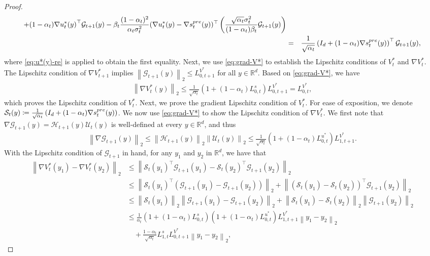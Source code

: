 \documentclass[10pt,a4paper]{amsart}
\newcommand{\R}{\mathbb{R}}
\newcommand{\parenthesis}[1]{\left( #1 \right)}
\newcommand{\mcal}[1]{\mathcal{#1}}
\newcommand{\norm}[1]{\left \|#1\right \|}
\begin{document}
\begin{proof}
\begin{eqnarray}
{ + (1 - \alpha_t) \nabla u_t^*(y)}^\top\mathcal{G}_{t+1}(y)- \beta_t \frac{(1 - \alpha_{t})^{2}}{\alpha_{t}\sigma_{t}^{2}}(\nabla u_t^*(y) - \nabla s^{\rm pre}_{t}(y))^\top\left(  \frac{\sqrt{\alpha_{t}}\sigma_{t}^{2}}{(1 - \alpha_{t})\beta_t}\mathcal{G}_{t+1}(y)\right)\nonumber\\
 &=&\frac{1}{\sqrt{\alpha_t}}\parenthesis{I_d 
 + (1 - \alpha_t) \nabla s_t^{\rm pre}(y)}^\top\mathcal{G}_{t+1}(y) \label{eq:grad-V*},
\end{eqnarray}
where \eqref{eq:u*(y)-re} is applied to obtain the first equality. Next, we use \eqref{eq:grad-V*} to establish the Lipschitz conditions of $ V_{t}^{*} $ and $\nabla V_t^{*}$. The Lipschitz condition of $\nabla V_{t+1}^*$ implies $\norm{\mcal{G}_{t+1}(y)}_2 \leq L_{0, t+1}^{V^*}$ for all $y \in \R^d$. Based on \eqref{eq:grad-V*}, we have
\begin{align*}
\norm{\nabla V_{t}^{*}(y)}_{2} \leq \frac{1}{\sqrt{\alpha_t}}(1 + (1 - \alpha_t)L_{0, t}^{s})
L_{0, t+1}^{V^*} = L_{0, t}^{V^*},
\end{align*}
which proves the Lipschitz condition of $ V_t^* $. Next, we prove the gradient Lipschitz condition of $ V_t^* $. For ease of exposition, we denote $\mathcal{S}_t(y) \coloneqq \frac{1}{\sqrt{\alpha_t}}\parenthesis{I_d 
+ (1 - \alpha_t) \nabla s_t^{\rm pre}(y)}$. We now use \eqref{eq:grad-V*} to show the Lipschitz condition of $\nabla V_t^*$. We first note that $ \nabla \mcal{G}_{t+1}(y) = \mcal{H}_{t+1}(y)\mcal{U}_t(y) $ is well-defined at every $y \in \R^d$, and thus
\begin{align*}
\norm{\nabla \mcal{G}_{t+1}(y)}_{2} \leq \norm{\mcal{H}_{t+1}(y)}_{2}\norm{\mcal{U}_t(y)}_{2} \leq \frac{1}{\sqrt{\alpha_{t}}}(1 + (1 - \alpha_{t})L_{0, t}^{u^*})L_{1, t+1}^{V^*}.
\end{align*}
 With the Lipschitz condition of $ \mcal{G}_{t+1} $ in hand,  for any $y_1$ and $y_2$ in $\R^d$, we have that
\begin{align*}
\norm{\nabla V_{t}^{*}(y_{1}) - \nabla V_{t}^{*}(y_{2})}_{2} & \leq \norm{\mcal{S}_t(y_{1})^{\top}\mcal{G}_{t+1}(y_{1}) - \mcal{S}_t(y_{2})^{\top}\mcal{G}_{t+1}(y_{2})}_2 \\ & \leq \norm{\mcal{S}_t(y_{1})^{\top}\parenthesis{\mcal{G}_{t+1}(y_{1}) - \mcal{G}_{t+1}(y_{2})}}_2 + \norm{\parenthesis{\mcal{S}_t(y_{1}) - \mcal{S}_t(y_{2})}^{\top}\mcal{G}_{t+1}(y_{2})}_{2} \\ & \leq \norm{\mcal{S}_t(y_{1})}_{2}\norm{\mcal{G}_{t+1}(y_{1}) - \mcal{G}_{t+1}(y_{2})}_{2} + \norm{\mcal{S}_t(y_{1}) - \mcal{S}_t(y_{2})}_{2}\norm{\mcal{G}_{t+1}(y_{2})}_{2} \\ & \leq \frac{1}{\alpha_{t}}(1 + (1 - \alpha_{t})L_{0, t}^s)(1 + (1 - \alpha_{t})L_{0, t}^{u^*})L_{1,t+1}^{V^*}\norm{y_{1} - y_{2}}_{2} \\ & \quad + \frac{1 - \alpha_{t}}{\sqrt{\alpha_{t}}}L_{1,t}^s L_{0, t+1}^{V^*}\norm{y_{1} - y_{2}}_{2},

\end{align*}
\end{proof}
\end{document}
